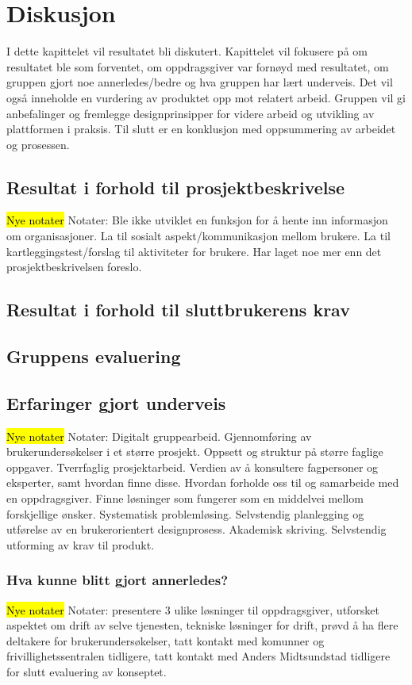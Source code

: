 \cleardoublepage
\chapter{Diskusjon}
\label{chap:discussion} 

I dette kapittelet vil resultatet bli diskutert. Kapittelet vil fokusere på om resultatet ble som forventet, om oppdragsgiver var fornøyd med resultatet, om gruppen gjort noe annerledes/bedre og hva gruppen har lært underveis. Det vil også inneholde en vurdering av produktet opp mot relatert arbeid. Gruppen vil gi anbefalinger og fremlegge designprinsipper for videre arbeid og utvikling av plattformen i praksis. Til slutt er en konklusjon med oppsummering av arbeidet og prosessen.

\section{Resultat i forhold til prosjektbeskrivelse}
\hl{Nye notater}
Notater:
Ble ikke utviklet en funksjon for å hente inn informasjon om organisasjoner.
La til sosialt aspekt/kommunikasjon mellom brukere.
La til kartleggingstest/forslag til aktiviteter for brukere.
Har laget noe mer enn det prosjektbeskrivelsen foreslo.

\section{Resultat i forhold til sluttbrukerens krav}

\section{Gruppens evaluering}

\section{Erfaringer gjort underveis}
\hl{Nye notater}
Notater:
Digitalt gruppearbeid.
Gjennomføring av brukerundersøkelser i et større prosjekt.
Oppsett og struktur på større faglige oppgaver.
Tverrfaglig prosjektarbeid.
Verdien av å konsultere fagpersoner og eksperter, samt hvordan finne disse.
Hvordan forholde oss til og samarbeide med en oppdragsgiver.
Finne løsninger som fungerer som en middelvei mellom forskjellige ønsker.
Systematisk problemløsing.
Selvstendig planlegging og utførelse av en brukerorientert designprosess.
Akademisk skriving.
Selvstendig utforming av krav til produkt.

\subsection{Hva kunne blitt gjort annerledes?}
\hl{Nye notater}
Notater: presentere 3 ulike løsninger til oppdragsgiver, utforsket aspektet om drift av selve tjenesten, tekniske løsninger for drift, prøvd å ha flere deltakere for brukerundersøkelser, tatt kontakt med komunner og frivillighetssentralen tidligere, tatt kontakt med Anders Midtsundstad tidligere for slutt evaluering av konseptet.

